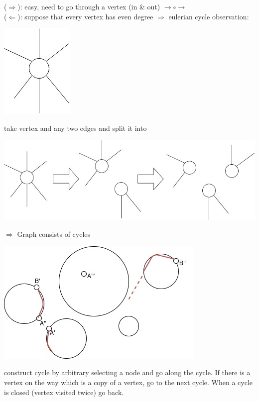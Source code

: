($\Rightarrow$): easy, need to go through a vertex (in \& out) $\rightarrow \circ \rightarrow$ \\
($\Leftarrow$): suppose that every vertex has even degree $\Rightarrow$ eulerian cycle observation: 
\begin{center}
	\includegraphics[scale=0.5]{img/vertex1}
\end{center}
take vertex and any two edges and split it into 
\begin{center}
	\includegraphics[scale=0.5]{img/vertex2}
\end{center}
$\Rightarrow$ Graph consists of cycles
\begin{center}
	\includegraphics[scale=0.5]{img/vertex3}
\end{center}
construct cycle by arbitrary selecting a node and go along the cycle. If there is a vertex on the way which is a copy of a vertex, go to the next cycle. When a cycle is closed (vertex visited twice) go back. 
